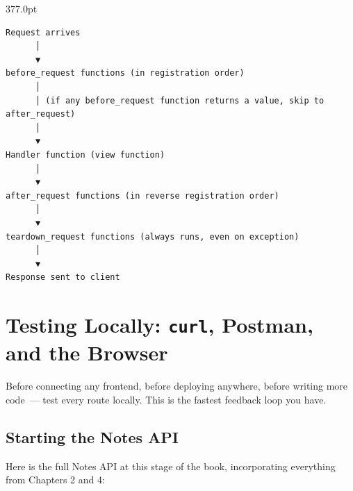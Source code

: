 \begin{diagrambox}[short]{377.0pt}
\begin{Verbatim}[fontsize=\fontsize{9.0}{8.55}\selectfont]
Request arrives
      │
      ▼
before_request functions (in registration order)
      │
      │ (if any before_request function returns a value, skip to after_request)
      │
      ▼
Handler function (view function)
      │
      ▼
after_request functions (in reverse registration order)
      │
      ▼
teardown_request functions (always runs, even on exception)
      │
      ▼
Response sent to client
\end{Verbatim}
\end{diagrambox}

\setcounter{section}{6}
\section{\texorpdfstring{Testing Locally: \texttt{curl}, Postman, and the Browser}{Testing Locally: curl, Postman, and the Browser}}\label{04-request-handling-paths:47-testing-locally-curl-postman-and-the-browser}

Before connecting any frontend, before deploying anywhere, before writing more code~--- test every route locally. This is the fastest feedback loop you have.

\subsection*{Starting the Notes API}\label{04-request-handling-paths:starting-the-notes-api}

Here is the full Notes API at this stage of the book, incorporating everything from Chapters 2 and 4:

